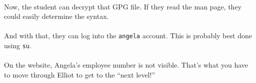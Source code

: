 \documentclass[11pt]{article}
\begin{document}
	\paragraph{} Now, the student can decrypt that GPG file. If they read the man page, they could easily determine the syntax.

	\begin{center}
		\graphicspath{ {.} }
		\centering
	\end{center}		
	
	\paragraph{} And with that, they can log into the \texttt{angela} account. This is probably best done using \texttt{su}.

	\paragraph{} On the website, Angela's employee number is not visible. That's what you have to move through Elliot to get to the ``next level!''

	\begin{center}
		\graphicspath{ {.} }
		\centering
	\end{center}
	
\end{document}
